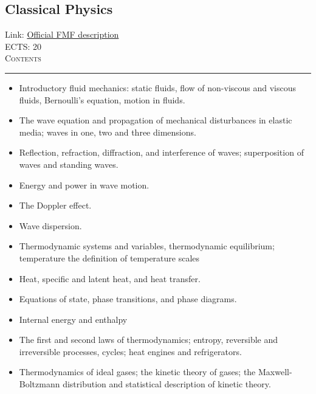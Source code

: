 \documentclass[11pt, a4paper]{article}
\newenvironment{course}[3]{
\subsection{#1}%
Link: \href{#2}{Official FMF description}\\%
ECTS: #3%
\vspace{1ex}
\\
{\large \textsc{Contents}}\\[-0.9ex]%
\rule{\textwidth}{0.5pt}
\vspace{-3ex}
}
{}
\newenvironment{chapter}[1]{
\begin{tcolorbox}[title=#1, breakable]
}
{\end{tcolorbox}}
\begin{document}
\begin{course}{Classical Physics}{https://www.fmf.uni-lj.si/en/study-physics/programmes/1fiz/2020/7000777/courses/1154/}{20}
\begin{chapter}{Mechanics}
\begin{itemize}
        \item Introductory fluid mechanics: static fluids, flow of non-viscous and viscous fluids, Bernoulli's equation, motion in fluids. 
    \end{itemize}

\end{chapter}

\begin{chapter}{Mechanical waves}
    \begin{itemize}
        \item The wave equation and propagation of mechanical disturbances in elastic media; waves in one, two and three dimensions.

        \item Reflection, refraction, diffraction, and interference of waves; superposition of waves and standing waves.

        \item Energy and power in wave motion.

        \item The Doppler effect.

        \item Wave dispersion.
        
    \end{itemize}
\end{chapter}

\begin{chapter}{Introduction to classical thermodynamics}
    \begin{itemize}
    
        \item Thermodynamic systems and variables, thermodynamic equilibrium; temperature the definition of temperature scales
        \item Heat, specific and latent heat, and heat transfer. 
        \item Equations of state, phase transitions, and phase diagrams.
        \item Internal energy and enthalpy
        \item The first and second laws of thermodynamics; entropy, reversible and irreversible processes, cycles; heat engines and refrigerators.
        \item Thermodynamics of ideal gases; the kinetic theory of gases; the Maxwell-Boltzmann distribution and statistical description of kinetic theory. 
    
    \end{itemize}
\end{chapter}


\end{course}
\end{document}
